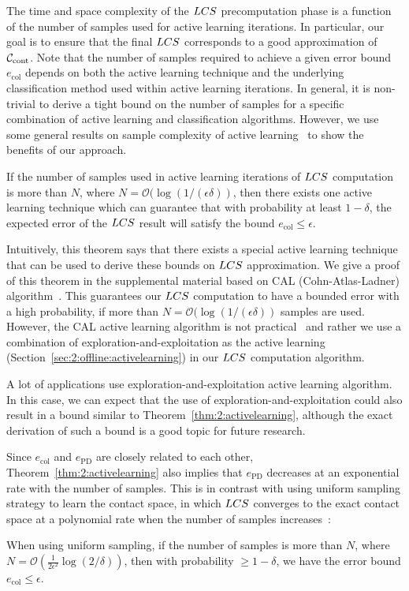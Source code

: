 The time and space complexity of the $LCS$ precomputation phase is a function of
the number of samples used for active learning iterations. In particular, our
goal is to ensure that the final $LCS$ corresponds to a good approximation of $\mathcal C_\text{cont}$. Note that the number of samples required to achieve a given error bound $e_{\text{col}}$ depends on both the active learning technique and the underlying classification method used within active learning iterations. In general, it is non-trivial to derive a tight bound on the number of samples for a specific combination of active learning and classification algorithms. However, we use some general results on sample complexity of active learning~\cite{Hanneke:2013} to show the benefits of our approach.
\begin{theorem}
\label{thm:2:activelearning}
If the number of samples used in active learning iterations of $LCS$ computation is more than $N$,
where $N=\mathcal O(\log(1/(\epsilon \delta))$, then there exists one active learning technique which can guarantee that with probability at least $1-\delta$, the expected error of the $LCS$ result will satisfy the bound $e_{\text{col}}\leq\epsilon$.
\end{theorem}

Intuitively, this theorem says that there exists a special active learning technique that can be used to derive these bounds on $LCS$ approximation. We give a proof of this theorem in the supplemental material based on CAL (Cohn-Atlas-Ladner) algorithm~\cite{Cohn:ML:1994}. This guarantees our $LCS$ computation to have a bounded error with a high probability, if more than $N=\mathcal O(\log(1/(\epsilon \delta))$ samples are used. However, the CAL active learning algorithm is not practical~\cite{Hanneke:2013} and rather we use a combination of exploration-and-exploitation as the active learning (Section~\ref{sec:2:offline:activelearning}) in our $LCS$ computation algorithm.

A lot of applications use exploration-and-exploitation active learning algorithm. In this case, we can expect that the use of exploration-and-exploitation could also result in a bound similar to Theorem~\ref{thm:2:activelearning}, although the exact derivation of such a bound is a good topic for future research.

Since $e_{\text{col}}$ and $e_{\text{PD}}$ are closely related to each other, Theorem~\ref{thm:2:activelearning} also implies that
$e_{\text{PD}}$ decreases at an exponential rate with the number of samples.
This is in contrast with using uniform sampling strategy to
learn the contact space, in which $LCS$ converges to the
exact contact space
at a polynomial rate when the number of samples
increases~\cite{Mohri:2012:FML}:
\begin{theorem}
\label{thm:2:uniform}
When using uniform sampling, if the number of samples is more than $N$, where $N = \mathcal O(
\frac{1}{2\epsilon^2} \log(2/\delta))$, then
with probability $\geq 1- \delta$, we have the error bound $e_{\text{col}} \leq
\epsilon$.
\end{theorem}

